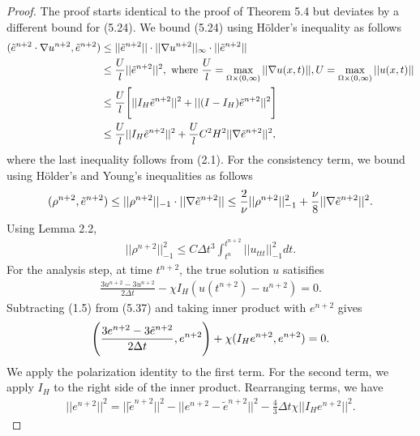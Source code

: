 \documentclass[10pt,a4paper]{amsart}
\begin{document}
\begin{proof}
    The proof starts identical to the proof of Theorem 5.4 but deviates by a different bound for (5.24).
    We bound (5.24) using H\"{o}lder's inequality as follows
    \begin{align}
        (\tilde{e}^{n+2}\cdot \nabla u^{n+2}, \Tilde{e}^{n+2}) 
        &\leq ||\tilde{e}^{n+2}||\cdot ||\nabla u^{n+2}||_\infty \cdot ||\Tilde{e}^{n+2}|| \notag \\
        &\leq \frac{U}{l}||\tilde{e}^{n+2}||^2, \text{ where } \frac{U}{l}=\max_{\Omega \times (0,\infty)}||\nabla u(x,t)||, U= \max_{\Omega \times (0,\infty)}|| u(x,t)||\notag \\
        &\leq \frac{U}{l}\Bigg[||I_H\tilde{e}^{n+2}||^2+ ||(I-I_H)\tilde{e}^{n+2}||^2\Bigg] \notag \\
        &\leq \frac{U}{l}||I_H\tilde{e}^{n+2}||^2+ \frac{U}{l}C^2H^2||\nabla \tilde{e}^{n+2}||^2,
    \end{align}
    where the last inequality follows from (2.1).
    For the consistency term, we bound using H\"{o}lder's and Young's inequalities as follows
    \begin{align}
        (\rho^{n+2}, \Tilde{e}^{n+2})\leq ||\rho^{n+2}||_{-1} \cdot ||\nabla \Tilde{e}^{n+2}||\leq \frac{2}{\nu}||\rho^{n+2}||_{-1}^2+\frac{\nu}{8}||\nabla \Tilde{e}^{n+2}||^2.
    \end{align}
    Using Lemma 2.2, 
    \begin{align}
        ||\rho^{n+2}||_{-1}^2\leq C\Delta t^3\int_{t^n}^{t^{n+2}}||u_{ttt}||_{-1}^2dt.
    \end{align}
    For the analysis step, at time $t^{n+2}$, the true solution $u$ satisifies
    \begin{align}
        \frac{3u^{n+2}-3u^{n+2}}{2\Delta t}-\chi I_H(u(t^{n+2})-u^{n+2})=0.
    \end{align}
    Subtracting (1.5) from (5.37) and taking inner product with $e^{n+2}$ gives
    \begin{align}
        \Bigg(\frac{3e^{n+2}-3\Tilde{e}^{n+2}}{2\Delta t}, e^{n+2}\Bigg)+\chi (I_He^{n+2},e^{n+2})=0.
    \end{align}
    We apply the polarization identity to the first term. For the second term, we apply $I_H$ to the right side of the inner product. Rearranging terms, we have 
    \begin{align}
        ||e^{n+2}||^2=||\tilde{e}^{n+2}||^2-||e^{n+2}-\tilde{e}^{n+2}||^2-\frac{4}{3}\Delta t\chi ||I_He^{n+2}||^2.
    \end{align}

\end{proof}
\end{document}
